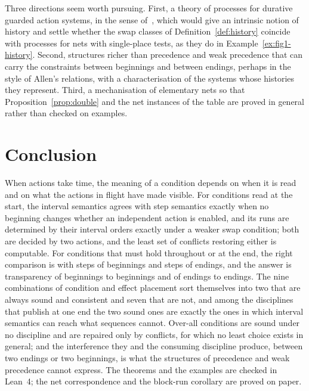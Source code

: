 \documentclass[preprint,12pt]{elsarticle}
\theoremstyle{plain}
\theoremstyle{definition}
\begin{document}
Three directions seem worth pursuing. First, a theory of processes for durative guarded action systems, in the sense of~\cite{AlqarniJanicki2018,ChatainHaarKoutnySchwoon2015}, which would give an intrinsic notion of history and settle whether the swap classes of Definition~\ref{def:history} coincide with processes for nets with single-place tests, as they do in Example~\ref{ex:fig1-history}. Second, structures richer than precedence and weak precedence that can carry the constraints between beginnings and between endings, perhaps in the style of Allen's relations, with a characterisation of the systems whose histories they represent. Third, a mechanisation of elementary nets so that Proposition~\ref{prop:double} and the net instances of the table are proved in general rather than checked on examples.

\section{Conclusion}
\label{sec:conclusion}

When actions take time, the meaning of a condition depends on when it is read and on what the actions in flight have made visible. For conditions read at the start, the interval semantics agrees with step semantics exactly when no beginning changes whether an independent action is enabled, and its runs are determined by their interval orders exactly under a weaker swap condition; both are decided by two actions, and the least set of conflicts restoring either is computable. For conditions that must hold throughout or at the end, the right comparison is with steps of beginnings and steps of endings, and the answer is transparency of beginnings to beginnings and of endings to endings. The nine combinations of condition and effect placement sort themselves into two that are always sound and consistent and seven that are not, and among the disciplines that publish at one end the two sound ones are exactly the ones in which interval semantics can reach what sequences cannot. Over-all conditions are sound under no discipline and are repaired only by conflicts, for which no least choice exists in general; and the interference they and the consuming discipline produce, between two endings or two beginnings, is what the structures of precedence and weak precedence cannot express. The theorems and the examples are checked in Lean~4; the net correspondence and the block-run corollary are proved on paper.
\end{document}
